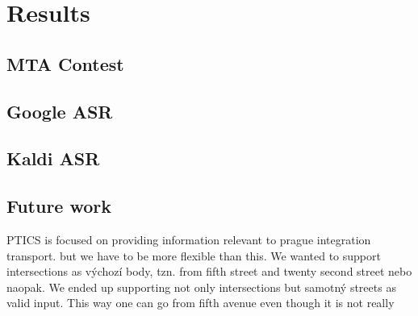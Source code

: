 \chapter{Results}


\section{MTA Contest}

\section{Google ASR}
\section{Kaldi ASR}

\section{Future work}






PTICS is focused on providing information relevant to prague integration transport. but we have to be more flexible than this. We wanted to support intersections as výchozí body, tzn. from fifth street and twenty second street nebo naopak. We ended up supporting not only intersections but samotný streets as valid input. This way one can go from fifth avenue even though it is not really 



